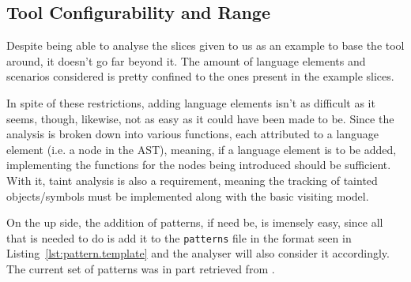 \subsection*{Tool Configurability and Range}
\label{sec:discussion.config}

Despite being able to analyse the slices given to us as an example to base the
tool around, it doesn't go far beyond it. The amount of language elements and
scenarios considered is pretty confined to the ones present in the example
slices.

In spite of these restrictions, adding language elements isn't as difficult as
it seems, though, likewise, not as easy as it could have been made to be. Since
the analysis is broken down into various functions, each attributed to a
language element (i.e. a node in the AST), meaning, if a language element is to
be added, implementing the functions for the nodes being introduced should be
sufficient. With it, taint analysis is also a requirement, meaning the tracking
of tainted objects/symbols must be implemented along with the basic visiting
model.

On the up side, the addition of patterns, if need be, is imensely easy, since
all that is needed to do is add it to the \verb|patterns| file in the format 
seen in Listing~\ref{lst:pattern.template} and the analyser will also consider
it accordingly. The current set of patterns was in part retrieved from
\cite{wap-manual:2017}.
